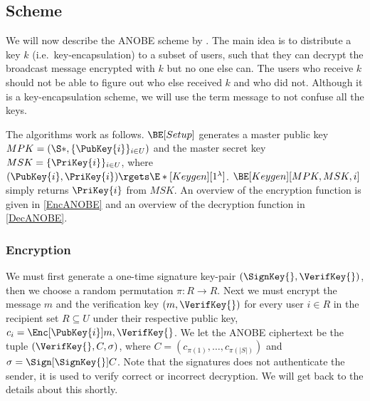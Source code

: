 \subsection{ Scheme}\label{ANOBE}

We will now describe the \ac{ANOBE} scheme by \citet{ANOBE}.
The main idea is to distribute a key \(k\) (i.e.\ key-encapsulation) to 
a subset of users, such that they can decrypt the broadcast message encrypted 
with \(k\) but no one else can.
The users who receive \(k\) should not be able to figure out who else received 
\(k\) and who did not.
Although it is a key-encapsulation scheme, we will use the term message to not 
confuse all the keys.

The algorithms work as follows.
\(\BE[Setup]\) generates a master public key \(MPK = (\S*, \{\PubKey{i}\}_{i\in
    U})\) and the master secret key \(MSK = \{\PriKey{i}\}_{i\in U}\), where 
\((\PubKey{i}, \PriKey{i})\rgets \E*[Keygen][1^\lambda]\).
\(\BE[Keygen][MPK, MSK, i]\) simply returns \(\PriKey{i}\) from \(MSK\).
An overview of the encryption function is given in \cref{EncANOBE} and an 
overview of the decryption function in \cref{DecANOBE}.

\subsubsection{Encryption}

We must first generate a one-time signature key-pair \((\SignKey{}, 
  \VerifKey{})\), then we choose a random permutation \(\pi\colon R\to R\).
Next we must encrypt the message \(m\) and the verification key \((m, 
  \VerifKey{})\) for every user \(i\in R\) in the recipient set \(R\subseteq 
  U\) under their respective public key, \(c_{i} = \Enc[\PubKey{i}]{m, 
    \VerifKey{}}\).
We let the \ac{ANOBE} ciphertext be the tuple \((\VerifKey{}, C, \sigma)\), 
where
\(C = ( c_{\pi(1)}, \ldots, c_{\pi({|S|})})\) and
\(\sigma = \Sign[\SignKey{}]{ C }\).
Note that the signatures does not authenticate the sender, it is used to verify 
correct or incorrect decryption.
We will get back to the details about this shortly.

